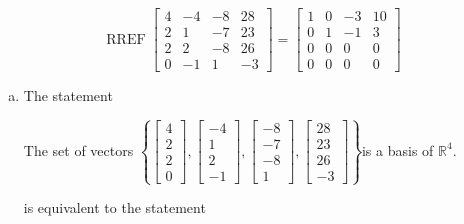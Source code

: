 \begin{exerciseAnswer} 


\[\operatorname{RREF} \left[\begin{array}{cccc}
4 & -4 & -8 & 28 \\
2 & 1 & -7 & 23 \\
2 & 2 & -8 & 26 \\
0 & -1 & 1 & -3
\end{array}\right] = \left[\begin{array}{cccc}
1 & 0 & -3 & 10 \\
0 & 1 & -1 & 3 \\
0 & 0 & 0 & 0 \\
0 & 0 & 0 & 0
\end{array}\right] \]


\begin{enumerate}[(a)]
\item The statement 
\begin{center}\begin{minipage}{0.8\textwidth}
 The set of vectors \( \left\{ \left[\begin{array}{c}
4 \\
2 \\
2 \\
0
\end{array}\right] , \left[\begin{array}{c}
-4 \\
1 \\
2 \\
-1
\end{array}\right] , \left[\begin{array}{c}
-8 \\
-7 \\
-8 \\
1
\end{array}\right] , \left[\begin{array}{c}
28 \\
23 \\
26 \\
-3
\end{array}\right] \right\} \)is a basis of \(\mathbb{R}^4\). 
\end{minipage}\end{center}
     is equivalent to the statement 
\begin{center}\begin{minipage}{0.8\textwidth}
 The set of vectors \( \left\{ \left[\begin{array}{c}
4 \\
2 \\

\end{array}
\end{minipage}
\end{center}
\end{enumerate}
\end{exerciseAnswer}
